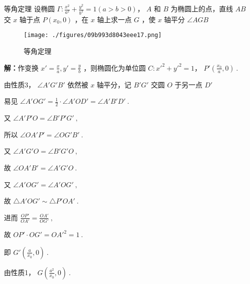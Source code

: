 \begin{corollary}{等角定理}
设椭圆 $\displaystyle{\Gamma:\frac{x^2}{a^2}+\frac{y^2}{b^2}=1(a>b>0)}$， $\displaystyle{A}$ 和 $\displaystyle{B}$ 为椭圆上的点，直线 $\displaystyle{AB}$ 交 $\displaystyle{x}$ 轴于点 $\displaystyle{P(x_0,0)}$ ，在 $\displaystyle{x}$ 轴上求一点 $\displaystyle{G}$ ，使 $\displaystyle{x}$ 轴平分 $\displaystyle{\angle AGB}$ 

\begin{figure}[ht]
\centering
\texttt{[image: ./figures/09b993d8043eee17.png]}
\caption{等角定理} \label{fig_affine_4}
\end{figure}
\textbf{解：}作变换 $\displaystyle{x'=\frac{x}{a},y'=\frac{y}{b}}$ ，则椭圆化为单位圆 $\displaystyle{C:x'^2+y'^2=1}$， $\displaystyle{P'\left(\frac{x_0}{a},0 \right)}~.$ 

由性质3， $\displaystyle{\angle A'G'B'}$ 依然被 $\displaystyle{x}$ 轴平分，记 $\displaystyle{B'G'}$ 交圆 $\displaystyle{O}$ 于另一点 $\displaystyle{D'}$

易见 $\displaystyle{\angle A'OG'=\frac{1}{2}\cdot\angle A'OD'=\angle A'B'D'}~.$ 

又 $\displaystyle{\angle A'P'O=\angle B'P'G'}~,$

所以 $\displaystyle{\angle OA'P'=\angle OG'B'}~.$

又 $\displaystyle{\angle A'G'O=\angle B'G'O}~,$

故 $\displaystyle{\angle OA'B'=\angle A'G'O}~.$

又 $\displaystyle{\angle A'OG'=\angle A'OG'}~,$

故 $\displaystyle{\triangle A'OG'\sim \triangle P'OA'}~.$

进而 $\displaystyle{\frac{OP'}{OA'}=\frac{OA'}{OG'}}~,$

故 $\displaystyle{OP'\cdot OG'=OA'^2=1}~.$ 

即 $\displaystyle{G'\left(\frac{a}{x_0},0\right)}~.$

由性质1， $\displaystyle{G\left( \frac{a^2}{x_0},0\right)}~.$ 

\end{corollary}

